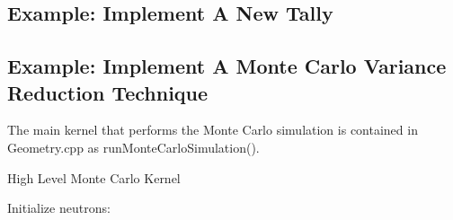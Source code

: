 \documentclass[titlepage]{article}
\begin{document}
\clearpage
\subsection{Example: Implement A New Tally} \label{example-add-tally}


\clearpage
\subsection{Example: Implement A Monte Carlo Variance Reduction Technique}
The main kernel that performs the Monte Carlo simulation is contained in Geometry.cpp as runMonteCarloSimulation(). 

\begin{algorithm}

\caption{High Level Monte Carlo Kernel}
\begin{algorithmic}
\STATE Initialize neutrons:

\ENDFOR
\ENDFOR
\end{algorithmic}
\end{algorithm}
\end{document}

